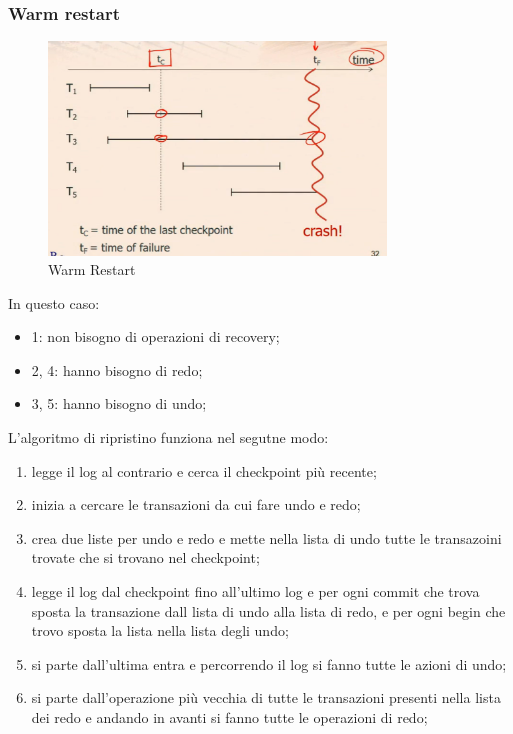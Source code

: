 \documentclass[12pt]{article}
\begin{document}
\subsubsection{Warm restart}
\begin{figure}[H]
    \centering
    \includegraphics[width=0.8\textwidth]{warm-restart.png}
    \caption{Warm Restart}
    \label{fig:warm-restart}
\end{figure}
In questo caso:
\begin{itemize}
    \item 1: non bisogno di operazioni di recovery;
    \item 2, 4: hanno bisogno di redo;
    \item 3, 5: hanno bisogno di undo;
\end{itemize}
L'algoritmo di ripristino funziona nel segutne modo:
\begin{enumerate}
    \item legge il log al contrario e cerca il checkpoint pi\`u recente;
    \item inizia a cercare le transazioni da cui fare undo e redo;
    \item crea due liste per undo e redo e mette nella lista di undo tutte le transazoini trovate che si trovano nel checkpoint;
    \item legge il log dal checkpoint fino all'ultimo log e per ogni commit che trova sposta la transazione dall lista di undo alla lista di redo, e per ogni begin che trovo sposta la lista nella lista degli undo;
    \item si parte dall'ultima entra e percorrendo il log si fanno tutte le azioni di undo;
    \item si parte dall'operazione pi\`u vecchia di tutte le transazioni presenti nella lista dei redo e andando in avanti si fanno tutte le operazioni di redo;
\end{enumerate}
\end{document}
